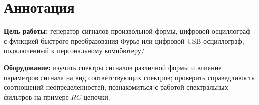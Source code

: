 \section{Аннотация}
\textbf{Цель работы:}
генератор сигналов произвольной формы, цифровой осциллограф с функцией быстрого преобразования
Фурье или цифровой USB-осциллограф, подключенный к персональному компбютеру/

\textbf{Оборудование:}
изучить спектры сигналов различной формы и влияние параметров сигнала на вид соответствующих
спектров; проверить справедливость соотношений неопределенностей; познакомиться с работой спектральных фильтров на примере $RC$-цепочки.

